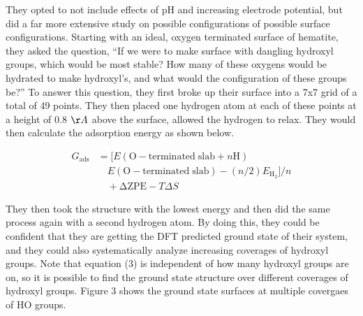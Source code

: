 \documentclass[11pt]{article}
\begin{document}
   They opted to not include effects of pH and increasing electrode 
   potential, but did a far more extensive study on possible
   configurations of possible surface configurations.
   Starting with an ideal, oxygen terminated surface of hematite, 
   they asked the question, ``If we were to make surface with dangling 
   hydroxyl groups, which would be most stable? How many of these
   oxygens would be hydrated to make hydroxyl's, and what would the
   configuration of these groups be?'' 
   To answer this question, they first broke up their surface into a 7x7
   grid of a total of 49 points. 
   They then placed one hydrogen atom at each of these points at a height
   of 0.8 $\AA$ above the surface, allowed the hydrogen to
   relax.
   They would then calculate the adsorption energy as shown below.
   
   \begin{equation}
   \begin{split}
   G_{\mathrm{ads}} &= [E(\mathrm{O-terminated\;slab} + n\mathrm{H}) \\
   &\quad E(\mathrm{O-terminated\;slab}) - (n/2)E_{\mathrm{H_2}}]/n \\
   &\quad + \mathrm{\Delta ZPE} - T\Delta S
   \end{split}
   \end{equation}
   
   They then took the structure with the lowest energy and then did the
   same process again with a second hydrogen atom. 
   By doing this, they could be confident that they are getting the
   DFT predicted ground state of their system, and they could also
   systematically analyze increasing coverages of hydroxyl groups.
   Note that equation (3) is independent of how many hydroxyl groups are
   on, so it is possible to find the ground state structure over
   different coverages of hydroxyl groups.
   Figure 3 shows the ground state surfaces at multiple covergaes of
   HO groups.
\end{document}
